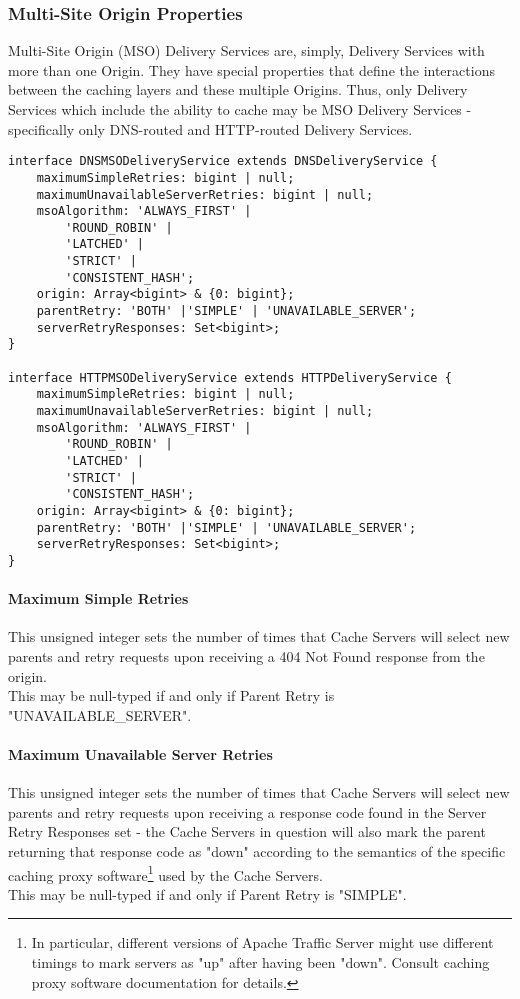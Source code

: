 \subsubsection{Multi-Site Origin Properties\label{sec:mso-props}}
Multi-Site Origin (MSO) Delivery Services are, simply, Delivery Services with
more than one Origin. They have special properties that define the interactions
between the caching layers and these multiple Origins. Thus, only Delivery
Services which include the ability to cache may be MSO Delivery Services -
specifically only DNS-routed and HTTP-routed Delivery Services.

\begin{codelisting}
\begin{verbatim}
interface DNSMSODeliveryService extends DNSDeliveryService {
	maximumSimpleRetries: bigint | null;
	maximumUnavailableServerRetries: bigint | null;
	msoAlgorithm: 'ALWAYS_FIRST' |
		'ROUND_ROBIN' |
		'LATCHED' |
		'STRICT' |
		'CONSISTENT_HASH';
	origin: Array<bigint> & {0: bigint};
	parentRetry: 'BOTH' |'SIMPLE' | 'UNAVAILABLE_SERVER';
	serverRetryResponses: Set<bigint>;
}

interface HTTPMSODeliveryService extends HTTPDeliveryService {
	maximumSimpleRetries: bigint | null;
	maximumUnavailableServerRetries: bigint | null;
	msoAlgorithm: 'ALWAYS_FIRST' |
		'ROUND_ROBIN' |
		'LATCHED' |
		'STRICT' |
		'CONSISTENT_HASH';
	origin: Array<bigint> & {0: bigint};
	parentRetry: 'BOTH' |'SIMPLE' | 'UNAVAILABLE_SERVER';
	serverRetryResponses: Set<bigint>;
}
\end{verbatim}
\end{codelisting}

\paragraph{Maximum Simple Retries}
This unsigned integer sets the number of times that Cache Servers will select
new parents and retry requests upon receiving a 404 Not Found response from the
origin.\\
This may be null-typed if and only if Parent Retry is "UNAVAILABLE\_SERVER".

\paragraph{Maximum Unavailable Server Retries}
This unsigned integer sets the number of times that Cache Servers will select
new parents and retry requests upon receiving a response code found in the
Server Retry Responses set - the Cache Servers in question will also mark the
parent returning that response code as "down" according to the semantics of the
specific caching proxy software\footnote{In particular, different versions of
Apache Traffic Server might use different timings to mark servers as "up" after
having been "down". Consult caching proxy software documentation for details.}
used by the Cache Servers.\\
This may be null-typed if and only if Parent Retry is "SIMPLE".

